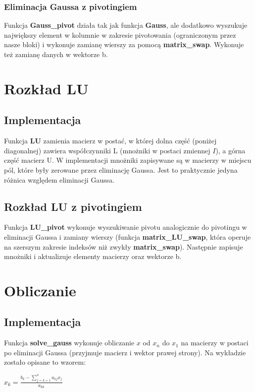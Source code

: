 \documentclass{article}
\begin{document}
\subsubsection*{Eliminacja Gaussa z pivotingiem}

Funkcja \textbf{Gauss\_pivot} działa tak jak funkcja \textbf{Gauss}, ale dodatkowo wyszukuje największy element w kolumnie w zakresie pivotowania (ograniczonym przez nasze bloki) i wykonuje zamianę wierszy za pomocą \textbf{matrix\_swap}. Wykonuje też zamianę danych w wektorze b.

\section*{Rozkład LU}
\subsection*{Implementacja}

Funkcja \textbf{LU} zamienia macierz w postać, w której dolna część (poniżej diagonalnej) zawiera współczynniki L (mnożniki w postaci zmiennej $I$), a górna część macierz U. W implementacji mnożniki zapisywane są w macierzy w miejscu pól, które były zerowane przez eliminację Gaussa. Jest to praktycznie jedyna różnica względem eliminacji Gaussa.

\subsection*{Rozkład LU z pivotingiem}

	Funkcja \textbf{LU\_pivot} wykonuje wyszukiwanie pivotu analogicznie do pivotingu w eliminacji Gaussa i zamiany wierszy (funkcja \textbf{matrix\_LU\_swap}, która operuje na szerszym zakresie indeksów niż zwykły \textbf{matrix\_swap}). Następnie zapisuje mnożniki i aktualizuje elementy macierzy oraz wektorze b.

\section*{Obliczanie}
\subsection*{Implementacja}

Funkcja \textbf{solve\_gauss} wykonuje obliczanie $x$ od $x_{n}$ do $x_{1}$ na macierzy w postaci po eliminacji Gaussa (przyjmuje macierz i wektor prawej strony). Na wykładzie zostało opisane to wzorem:
\begin{center}
  $x_{k}=\frac{b_{k}-\sum_{j=k+1}^{n}a_{kj}x_{j}}{a_{kk}}$
\end{center}
\end{document}
